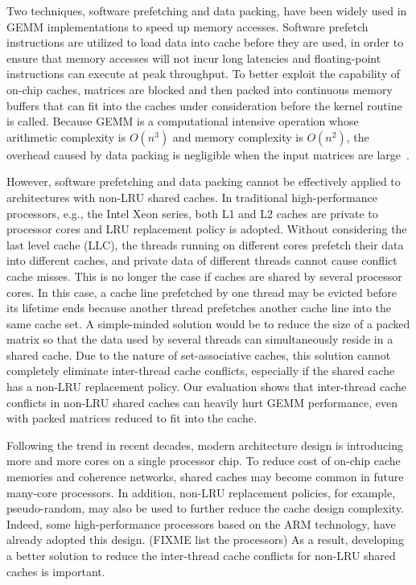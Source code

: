Two techniques, software prefetching and data packing,
have been widely used in GEMM implementations to speed up memory accesses.
Software prefetch instructions are utilized
to load data into cache before they are used, in 
order to ensure that memory accesses will not incur
long latencies and floating-point instructions
can execute at peak throughput.
To better exploit the capability of on-chip caches,
matrices are blocked and then packed into continuous memory buffers
that can fit into the caches under consideration
before the kernel routine is called.
Because GEMM is a computational intensive operation whose
arithmetic complexity is $O(n^3)$ and memory complexity is $O(n^2)$,
the overhead caused by data packing is negligible when
the input matrices are large~\cite{gotogemm}.

However, software prefetching and data packing cannot be
effectively
applied to architectures with non-LRU shared caches.
In traditional high-performance processors, e.g.,
the Intel Xeon series,
both L1 and L2 caches are private to processor cores
and LRU replacement policy is adopted.
Without considering the last level cache (LLC),
the threads running on different cores prefetch their data into
different caches, and private data of different threads
cannot cause conflict cache misses.
This is no longer the case if caches are shared by several processor cores.
In this case, a cache line prefetched by one thread
may be evicted before its lifetime ends because another thread prefetches
another cache line into the same cache set.
A simple-minded solution would be to reduce 
the size of a packed matrix
so that the data used by several threads can simultaneously reside in a shared cache.
Due to the nature of set-associative caches,
this solution cannot completely eliminate inter-thread cache conflicts,
especially if the shared cache has a non-LRU replacement policy.
Our evaluation shows that inter-thread cache conflicts
in non-LRU shared caches
can heavily hurt GEMM performance,
even with packed matrices reduced to fit into the cache.

Following the trend in recent decades, modern architecture design
is introducing more and more cores on a single processor chip.
To reduce cost of on-chip cache memories and coherence networks,
shared caches may become common in future many-core processors.
In addition, non-LRU replacement policies, for example, pseudo-random,
may also be used to further reduce the cache design complexity.
Indeed, some high-performance processors based on the
ARM technology,
have already adopted this design. (FIXME list the processors)
As a result, developing a better solution to reduce
the inter-thread cache conflicts 
for non-LRU shared caches is important.

